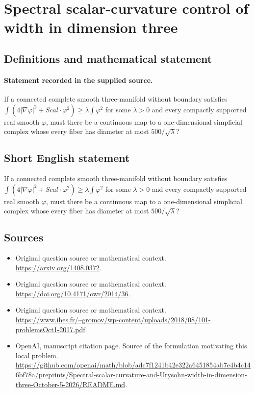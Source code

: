 \documentclass[11pt]{article}
\begin{document}
\section*{Spectral scalar-curvature control of width in dimension three}\label{statement}
\subsection{Definitions and mathematical statement}
\paragraph{Statement recorded in the supplied source.}
If a connected complete smooth three-manifold without boundary satisfies $\int (4|\nabla \varphi |^{2}+Scal\cdot \varphi ^{2})\geq \lambda \int \varphi ^{2}$ for some $\lambda >0$ and every compactly supported real smooth $\varphi $, must there be a continuous map to a one-dimensional simplicial complex whose every fiber has diameter at most $500/\surd \lambda $?
\subsection{Short English statement}
If a connected complete smooth three-manifold without boundary satisfies $\int (4|\nabla \varphi |^{2}+Scal\cdot \varphi ^{2})\geq \lambda \int \varphi ^{2}$ for some $\lambda >0$ and every compactly supported real smooth $\varphi $, must there be a continuous map to a one-dimensional simplicial complex whose every fiber has diameter at most $500/\surd \lambda $?
\subsection{Sources}
\begin{itemize}
\item[S1] Original question source or mathematical context.
\url{https://arxiv.org/1408.0372}.
\item[S2] Original question source or mathematical context.
\url{https://doi.org/10.4171/owr/2014/36}.
\item[S3] Original question source or mathematical context.
\url{https://www.ihes.fr/~gromov/wp-content/uploads/2018/08/101-problemsOct1-2017.pdf}.
\item[S4] OpenAI, manuscript citation page. Source of the formulation motivating this local problem.
\url{https://github.com/openai/math/blob/adc7f1241b42e322a6451854ab7e4b4c146bf78a/preprints/Spectral-scalar-curvature-and-Urysohn-width-in-dimension-three-October-5-2026/README.md}.
\end{itemize}
\end{document}
